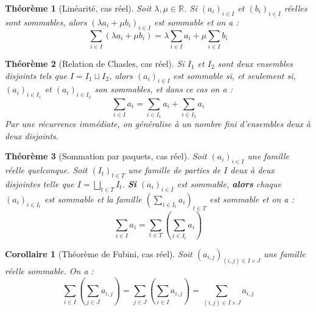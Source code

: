 \documentclass[french]{book}
\newcommand{\R}{\mathbb{R}}
\theoremstyle{plain}
\newtheorem{thm}{Théorème}[chapter]
\newtheorem{cor}{Corollaire}[chapter]
\theoremstyle{definition}
\theoremstyle{remark}
\begin{document}
\begin{thm}[Linéarité, cas réel]
	Soit $\lambda,\mu\in\R$. Si $(a_i)_{i\in I}$ et $(b_i)_{i\in I}$ réelles sont sommables, alors $(\lambda a_i+\mu b_i)_{i\in I}$ est sommable et on a : $$\sum_{i\in I}(\lambda a_i+\mu b_i)=\lambda\sum_{i\in I}a_i+\mu\sum_{i\in I}b_i$$
\end{thm}
\begin{thm}[Relation de Chasles, cas réel]
	Si $I_1$ et $I_2$ sont deux ensembles disjoints tels que $I=I_1\sqcup I_2$, alors $(a_i)_{i\in I}$ est sommable si, et seulement si, $(a_i)_{i\in I_1}$ et $(a_i)_{i\in I_2}$ son sommables, et dans ce cas on a : $$\sum_{i\in I}a_i=\sum_{i\in I_1}a_i+\sum_{i\in I_2}a_i$$ Par une récurrence immédiate, on généralise à un nombre fini d'ensembles deux à deux disjoints.
\end{thm}
\begin{thm}[Sommation par paquets, cas réel]
	Soit $(a_i)_{i\in I}$ une famille réelle quelconque. Soit $(I_t)_{t\in T}$ une famille de parties de $I$ deux à deux disjointes telle que $\displaystyle I=\bigsqcup_{t\in T}I_t$. \textbf{Si} $(a_i)_{i\in I}$ est sommable, \textbf{alors} chaque $(a_i)_{i\in I_t}$ est sommable et la famille $\displaystyle \left(\sum_{i\in I_t}a_i\right)_{t\in T}$ est sommable et on a : $$\sum_{i\in I}a_i=\sum_{t\in T}\left(\sum_{i\in I_t}a_i\right)$$
\end{thm}
\begin{cor}[Théorème de Fubini, cas réel]
	Soit $(a_{i,j})_{(i,j)\in I\times J}$  une famille réelle sommable. On a : $$\sum_{i\in I}\left(\sum_{j\in J}a_{i,j}\right)=\sum_{j\in J}\left(\sum_{i\in I}a_{i,j}\right)=\sum_{(i,j)\in I\times J}a_{i,j}$$
\end{cor}
\end{document}
